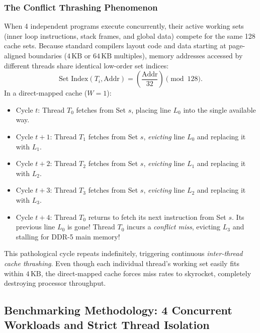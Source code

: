 \subsubsection{The Conflict Thrashing Phenomenon}
When 4 independent programs execute concurrently, their active working sets (inner loop instructions, stack frames, and global data) compete for the same 128 cache sets. Because standard compilers layout code and data starting at page-aligned boundaries ($4\,\text{KB}$ or $64\,\text{KB}$ multiples), memory addresses accessed by different threads share identical low-order set indices:
\begin{equation}
\text{Set Index}(T_i, \text{Addr}) = \left(\frac{\text{Addr}}{32}\right) \pmod{128}.
\end{equation}
In a direct-mapped cache ($W = 1$):
\begin{itemize}
    \item Cycle $t$: Thread $T_0$ fetches from Set $s$, placing line $L_{0}$ into the single available way.
    \item Cycle $t+1$: Thread $T_1$ fetches from Set $s$, \textit{evicting} line $L_{0}$ and replacing it with $L_{1}$.
    \item Cycle $t+2$: Thread $T_2$ fetches from Set $s$, \textit{evicting} line $L_{1}$ and replacing it with $L_{2}$.
    \item Cycle $t+3$: Thread $T_3$ fetches from Set $s$, \textit{evicting} line $L_{2}$ and replacing it with $L_{3}$.
    \item Cycle $t+4$: Thread $T_0$ returns to fetch its next instruction from Set $s$. Its previous line $L_0$ is gone! Thread $T_0$ incurs a \textit{conflict miss}, evicting $L_{3}$ and stalling for DDR-5 main memory!
\end{itemize}
This pathological cycle repeats indefinitely, triggering continuous \textit{inter-thread cache thrashing}. Even though each individual thread's working set easily fits within $4\,\text{KB}$, the direct-mapped cache forces miss rates to skyrocket, completely destroying processor throughput.


\subsection{Benchmarking Methodology: 4 Concurrent Workloads and Strict Thread Isolation}

